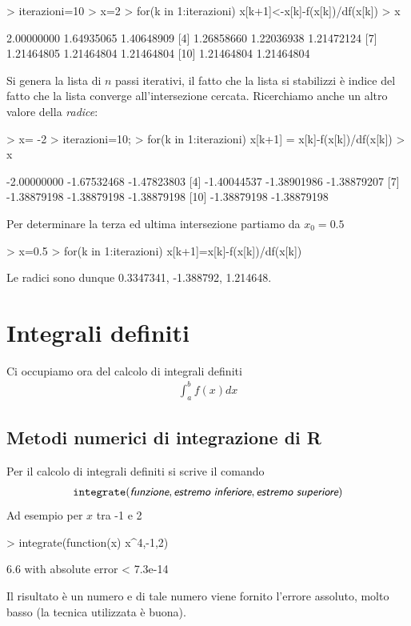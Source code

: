 \documentclass[onecolumn,11pt]{book}
\newcommand{\varia}[1]{\textsl{\textsf{#1}}}
\begin{document}
\begin{Schunk}
\begin{Sinput}
> iterazioni=10
> x=2
> for(k in 1:iterazioni) x[k+1]<-x[k]-f(x[k])/df(x[k])
> x
\end{Sinput}
\begin{Soutput}
 [1] 2.00000000 1.64935065 1.40648909
 [4] 1.26858660 1.22036938 1.21472124
 [7] 1.21464805 1.21464804 1.21464804
[10] 1.21464804 1.21464804
\end{Soutput}
\end{Schunk}
Si genera la lista di $n$ passi iterativi, il fatto che la lista si stabilizzi \`e indice del fatto che la lista converge all'intersezione cercata.  Ricerchiamo anche un altro valore della {\it radice}:
\begin{Schunk}
\begin{Sinput}
> x= -2
> iterazioni=10;
> for(k in 1:iterazioni) x[k+1] = x[k]-f(x[k])/df(x[k])
> x
\end{Sinput}
\begin{Soutput}
 [1] -2.00000000 -1.67532468 -1.47823803
 [4] -1.40044537 -1.38901986 -1.38879207
 [7] -1.38879198 -1.38879198 -1.38879198
[10] -1.38879198 -1.38879198
\end{Soutput}
\end{Schunk}
Per determinare la terza ed ultima intersezione partiamo da $x_0=0.5$
\begin{Schunk}
\begin{Sinput}
> x=0.5
> for(k in 1:iterazioni) x[k+1]=x[k]-f(x[k])/df(x[k])
\end{Sinput}
\end{Schunk}
Le radici sono dunque 0.3347341, -1.388792, 1.214648.


\section{Integrali definiti}
Ci occupiamo ora del calcolo di integrali definiti
\begin{eqnarray*}
\int_a^b f(x)dx
\end{eqnarray*}

\subsection{Metodi numerici di integrazione di \textsf{R}}
Per il calcolo di integrali definiti si scrive il comando
\begin{eqnarray*}
\texttt{integrate}(\varia{funzione},
\varia{estremo inferiore}, \varia{estremo superiore})
\end{eqnarray*}
Ad esempio per $x$ tra -1 e 2
\begin{Schunk}
\begin{Sinput}
> integrate(function(x) x^4,-1,2) 
\end{Sinput}
\begin{Soutput}
6.6 with absolute error < 7.3e-14
\end{Soutput}
\end{Schunk}
Il risultato \`e un numero e di tale numero viene fornito l'errore assoluto, molto basso (la tecnica utilizzata \`e buona).
\end{document}
